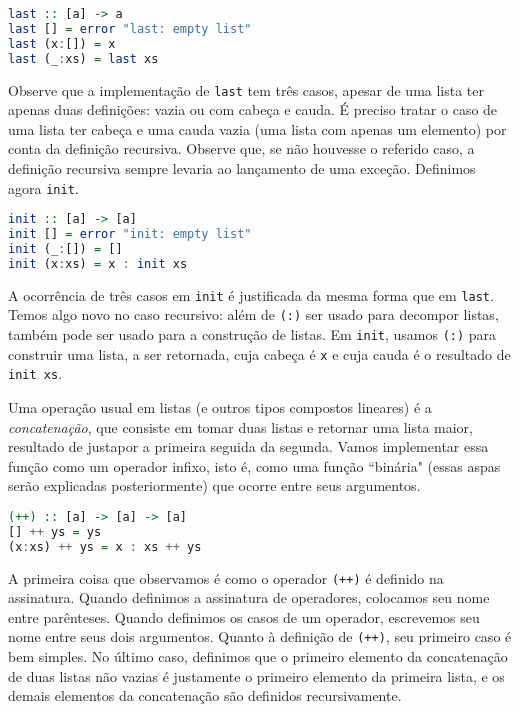 \documentclass[a4paper]{article}
\begin{document}
\begin{lstlisting}[language=haskell, frame=single]
last :: [a] -> a
last [] = error "last: empty list"
last (x:[]) = x
last (_:xs) = last xs
\end{lstlisting}

Observe que a implementação de \texttt{last} tem três casos, apesar de uma lista ter apenas duas definições: vazia ou com cabeça e cauda.
É preciso tratar o caso de uma lista ter cabeça e uma cauda vazia (uma lista com apenas um elemento) por conta da definição recursiva.
Observe que, se não houvesse o referido caso, a definição recursiva sempre levaria ao lançamento de uma exceção.
Definimos agora \texttt{init}.

\begin{lstlisting}[language=haskell, frame=single]
init :: [a] -> [a]
init [] = error "init: empty list"
init (_:[]) = []
init (x:xs) = x : init xs
\end{lstlisting}

A ocorrência de três casos em \texttt{init} é justificada da mesma forma que em \texttt{last}.
Temos algo novo no caso recursivo: além de \texttt{(:)} ser usado para decompor listas, também pode ser usado para a construção de listas.
Em \texttt{init}, usamos \texttt{(:)} para construir uma lista, a ser retornada, cuja cabeça é \texttt{x} e cuja cauda é o resultado de \texttt{init xs}.

Uma operação usual em listas (e outros tipos compostos lineares) é a \emph{concatenação}, que consiste em tomar duas listas e retornar uma lista maior, resultado de justapor a primeira seguida da segunda.
Vamos implementar essa função como um operador infixo, isto é, como uma função ``binária" (essas aspas serão explicadas posteriormente) que ocorre entre seus argumentos.

\begin{lstlisting}[language=haskell, frame=single]
(++) :: [a] -> [a] -> [a]
[] ++ ys = ys
(x:xs) ++ ys = x : xs ++ ys
\end{lstlisting}

A primeira coisa que observamos é como o operador \texttt{(++)} é definido na assinatura.
Quando definimos a assinatura de operadores, colocamos seu nome entre parênteses.
Quando definimos os casos de um operador, escrevemos seu nome entre seus dois argumentos.
Quanto à definição de \texttt{(++)}, seu primeiro caso é bem simples.
No último caso, definimos que o primeiro elemento da concatenação de duas listas não vazias é justamente o primeiro elemento da primeira lista, e os demais elementos da concatenação são definidos recursivamente.
\end{document}
